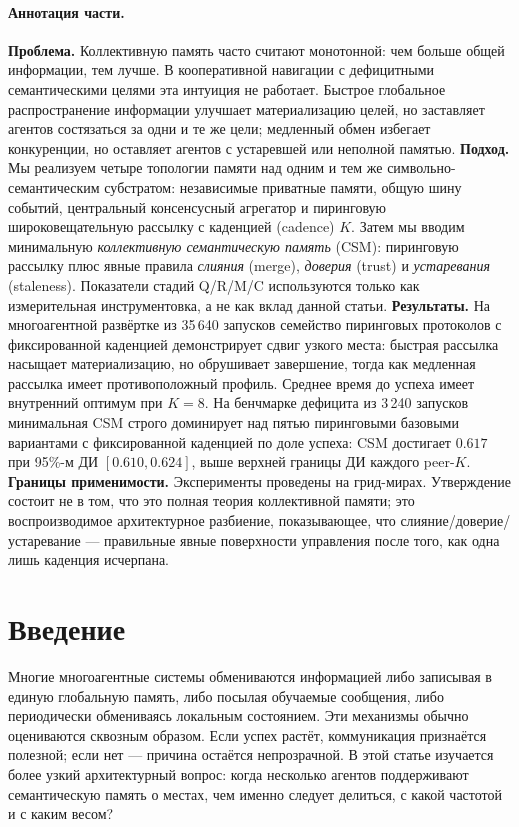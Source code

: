 \documentclass{article}
\begin{document}
\paragraph{Аннотация части.} \textbf{Проблема.} Коллективную память часто считают монотонной: чем больше общей информации, тем лучше. В кооперативной навигации с дефицитными семантическими целями эта интуиция не работает. Быстрое глобальное распространение информации улучшает материализацию целей, но заставляет агентов состязаться за одни и те же цели; медленный обмен избегает конкуренции, но оставляет агентов с устаревшей или неполной памятью.
\textbf{Подход.} Мы реализуем четыре топологии памяти над одним и тем же символьно-семантическим субстратом: независимые приватные памяти, общую шину событий, центральный консенсусный агрегатор и пиринговую широковещательную рассылку с каденцией (cadence) $K$. Затем мы вводим минимальную \emph{коллективную семантическую память} (CSM): пиринговую рассылку плюс явные правила \emph{слияния} (merge), \emph{доверия} (trust) и \emph{устаревания} (staleness). Показатели стадий Q/R/M/C используются только как измерительная инструментовка, а не как вклад данной статьи.
\textbf{Результаты.} На многоагентной развёртке из 35\,640 запусков семейство пиринговых протоколов с фиксированной каденцией демонстрирует сдвиг узкого места: быстрая рассылка насыщает материализацию, но обрушивает завершение, тогда как медленная рассылка имеет противоположный профиль. Среднее время до успеха имеет внутренний оптимум при $K{=}8$. На бенчмарке дефицита из 3\,240 запусков минимальная CSM строго доминирует над пятью пиринговыми базовыми вариантами с фиксированной каденцией по доле успеха: CSM достигает $0.617$ при 95\%-м ДИ $[0.610,0.624]$, выше верхней границы ДИ каждого peer-$K$.
\textbf{Границы применимости.} Эксперименты проведены на грид-мирах. Утверждение состоит не в том, что это полная теория коллективной памяти; это воспроизводимое архитектурное разбиение, показывающее, что слияние/доверие/устаревание --- правильные явные поверхности управления после того, как одна лишь каденция исчерпана.

\FloatBarrier
\section{Введение}

Многие многоагентные системы обмениваются информацией либо записывая
в единую глобальную память, либо посылая обучаемые сообщения, либо
периодически обмениваясь локальным состоянием. Эти механизмы обычно
оцениваются сквозным образом. Если успех растёт, коммуникация
признаётся полезной; если нет --- причина остаётся непрозрачной. В этой
статье изучается более узкий архитектурный вопрос: когда несколько
агентов поддерживают семантическую память о местах, чем именно следует
делиться, с какой частотой и с каким весом?
\end{document}
